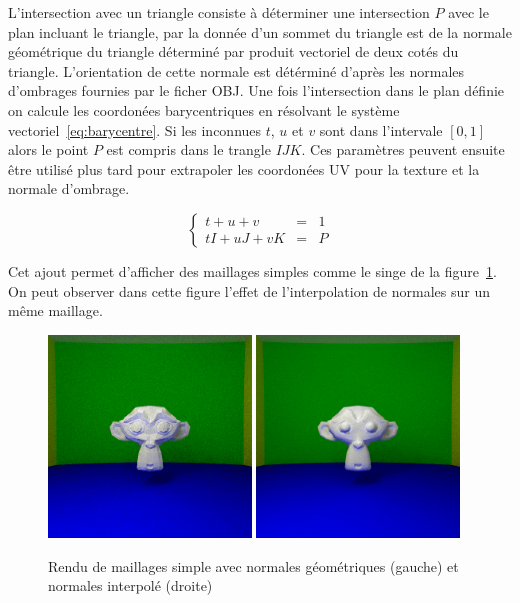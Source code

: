 \documentclass[12pt]{article}
\begin{document}
L'intersection avec un triangle consiste à déterminer une intersection $P$ avec le plan incluant le triangle, par la donnée d'un sommet du triangle est de la normale géométrique du triangle déterminé par produit vectoriel de deux cotés du triangle.
L'orientation de cette normale est détérminé d'après les normales d'ombrages fournies par le ficher OBJ\@.
Une fois l'intersection dans le plan définie on calcule les coordonées barycentriques en résolvant le système vectoriel~\ref{eq:barycentre}.
Si les inconnues $t$, $u$ et $v$ sont dans l'intervale $[0, 1]$ alors le point $P$ est compris dans le trangle $IJK$.
Ces paramètres peuvent ensuite être utilisé plus tard pour extrapoler les coordonées UV pour la texture et la normale d'ombrage.

\begin{equation}
  \left\{
    \begin{array}{lcr}
      t + u + v & = & 1\\
      t I + u J + v K & = & P
      \label{eq:barycentre}
    \end{array}
  \right.
\end{equation}

Cet ajout permet d'afficher des maillages simples comme le singe de la figure~\ref{fig:step9}.
On peut observer dans cette figure l'effet de l'interpolation de normales sur un même maillage.

\begin{figure}[ht]
  \centering
  \includegraphics[width=0.48\textwidth]{pic/flat_monkey.png}
  \includegraphics[width=0.48\textwidth]{../result/step9}
  \caption{Rendu de maillages simple avec normales géométriques (gauche) et normales interpolé (droite)}\label{fig:step9}
\end{figure}
\end{document}

